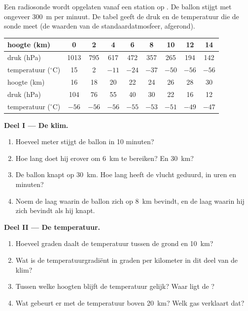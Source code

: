 \begin{problem}
\label{pb:g8:the-atmosphere:1}
Een radiosonde wordt opgelaten vanaf een station op . De ballon
stijgt met ongeveer \qty{300}{m} per minuut. De tabel geeft de druk en de
temperatuur die de sonde meet (de waarden van de standaardatmosfeer,
afgerond).

\begin{center}\small
\begin{tabular}{|l|*{8}{c|}}
\hline
hoogte (km) & 0 & 2 & 4 & 6 & 8 & 10 & 12 & 14 \\
\hline
druk (hPa) & 1013 & 795 & 617 & 472 & 357 & 265 & 194 & 142 \\
\hline
temperatuur ($^\circ$C) & 15 & 2 & $-11$ & $-24$ & $-37$ & $-50$ & $-56$ & $-56$ \\
\hline
\hline
hoogte (km) & 16 & 18 & 20 & 22 & 24 & 26 & 28 & 30 \\
\hline
druk (hPa) & 104 & 76 & 55 & 40 & 30 & 22 & 16 & 12 \\
\hline
temperatuur ($^\circ$C) & $-56$ & $-56$ & $-56$ & $-55$ & $-53$ & $-51$ & $-49$ & $-47$ \\
\hline
\end{tabular}
\end{center}

\noindent\textbf{Deel I --- De klim.}\par\nopagebreak
\begin{enumerate}[beginpenalty=10000]
  \item Hoeveel meter stijgt de ballon in 10 minuten?
  \item Hoe lang doet hij erover om \qty{6}{km} te bereiken? En
        \qty{30}{km}?
  \item De ballon knapt op \qty{30}{km}. Hoe lang heeft de vlucht geduurd,
        in uren en minuten?
  \item Noem de laag waarin de ballon zich op \qty{8}{km} bevindt, en de laag
        waarin hij zich bevindt als hij knapt.
\end{enumerate}

\noindent\textbf{Deel II --- De temperatuur.}\par\nopagebreak
\begin{enumerate}[resume, beginpenalty=10000]
  \item Hoeveel graden daalt de temperatuur tussen de grond en
        \qty{10}{km}?
  \item Wat is de temperatuurgradiënt in graden per kilometer in dit deel
        van de klim?
  \item Tussen welke hoogten blijft de temperatuur gelijk? Waar ligt de
        ?
  \item Wat gebeurt er met de temperatuur boven \qty{20}{km}? Welk gas
        verklaart dat?
\end{enumerate}


\end{problem}
